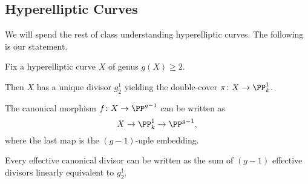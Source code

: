 \documentclass[../notes.tex]{subfiles}
\begin{document}
\subsection{Hyperelliptic Curves}
We will spend the rest of class understanding hyperelliptic curves. The following is our statement.
\begin{theorem}
	Fix a hyperelliptic curve $X$ of genus $g(X)\ge2$.
	\begin{listalph}
		\item Then $X$ has a unique divisor $g^1_2$ yielding the double-cover $\pi\colon X\to\PP^1_k$.
		\item The canonical morphism $f\colon X\to\PP^{g-1}$ can be written as
		\[X\to\PP^1_k\to\PP^{g-1},\]
		where the last map is the $(g-1)$-uple embedding.
		\item Every effective canonical divisor can be written as the sum of $(g-1)$ effective divisors linearly equivalent to $g^1_2$.
	\end{listalph}
\end{theorem}
\end{document}
